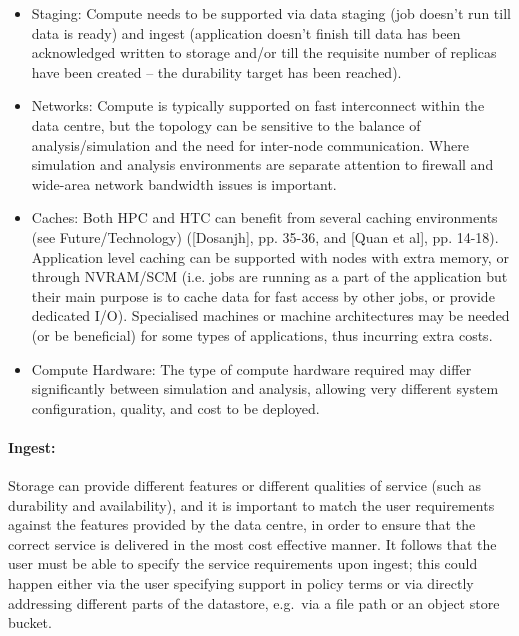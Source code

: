 \begin{itemize}
\item Staging: Compute needs to be supported via data staging (job doesn’t
run till data is ready) and ingest (application doesn’t finish till data has
been acknowledged written to storage and/or till the requisite number of replicas
have been created – the durability target has been reached). %
\item Networks: Compute is typically supported on fast interconnect within the data centre,
but the topology can be sensitive to the balance of analysis/simulation and
the need for inter-node communication.  Where simulation and analysis
environments are separate attention to firewall and wide-area network
bandwidth issues is important.
\item Caches:  Both HPC and HTC can benefit from several caching environments
(see Future/Technology) ([Dosanjh],
pp. 35-36, and [Quan et al], pp. 14-18). Application level caching can be
supported with nodes with extra memory, or through NVRAM/SCM (i.e. jobs are
running as a part of the application but their main purpose is to cache data for
fast access by other jobs, or provide dedicated I/O).  Specialised
machines or machine architectures may be needed (or be beneficial) for some
types of applications, thus incurring extra costs.
\item Compute Hardware: The type of compute hardware required may differ
significantly between simulation and analysis, allowing very different
system configuration, quality, and cost to be deployed.
\end{itemize}

\paragraph{Ingest:} Storage can provide different features or different
qualities of service (such as durability and availability), and it is important
to match the user requirements against the features provided by the data centre,
in order to ensure that the correct service is delivered in the most cost
effective manner.  It follows that the user must be able to specify the service
requirements upon ingest; this could happen either via the user specifying
support in policy terms or via directly addressing different parts of the
datastore, e.g.\ via a file path or an object store bucket.


